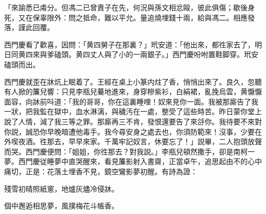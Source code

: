 \begin{myquote}[\markfont]
「來諭悉已䖏分。但馮二已曾責子在先，何況與孫文相忿毆，彼此俱傷；歇後身死，又在保辜限外：問之抵命，難以平允。量追燒埋錢十兩，給與馮二。相應發落，謹此回覆。

\end{myquote}

西門慶看了歡喜，因問：「黄四舅子在那裏？」玳安道：「他出來，都徃家去了，明日同黄四來與爹磕頭。黄四丈人與了小的一兩銀子。」西門慶吩咐置鞋脚穿。玳安磕頭而出。

西門慶就歪在牀炕上眠着了。王經在桌上小篆内炷了香，悄悄出來了。良久，忽聽有人掀的簾兒響：只見李瓶兒驀地進來，身穿糝紫衫，白絹裙，亂挽烏雲，黄懨懨面容，向牀前呌道：「我的哥哥，你在這裏睡哩！奴來見你一面。我被那廝告了我一狀，把我監在獄中，血水淋漓，與穢汚在一處，整受了這些時苦。昨日蒙你堂上說了人情，減了我三等之罪。那廝再三不肯，發恨還要告了來㧱你。我待要不來對你説，誠恐你早晚暗遭他毒手。我今尋安身之處去也，你須防範來！沒事，少要在外喫夜酒。徃那去，早早來家。千萬牢記奴言，休要忘了！」説畢，二人抱頭放聲而哭。西門慶便問：「姐姐，你徃那去？對我説。」李瓶兒頓然撒手，卻是南柯一夢。西門慶従睡夢中直哭醒來，看見簾影射入書齋，正當卓午，追思起由不的心中痛切，正是：花落土埋香不見，鏡空鸞影夢初醒。有詩為證：

\begin{myquote}
殘雪初晴照紙窻，地爐灰燼冷侵牀。

個中邂逅相思夢，風撲梅花斗帳香。
\end{myquote}

